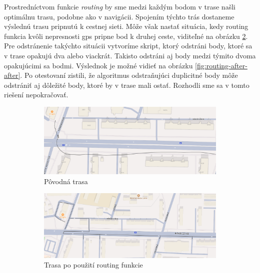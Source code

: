 Prostredníctvom funkcie \textit{routing} by sme medzi každým bodom v trase našli optimálnu trasu, podobne ako v navigácii. Spojením týchto trás dostaneme výslednú trasu pripnutú k cestnej sieti. Môže však nastať situácia, kedy routing funkcia kvôli nepresnosti \acrshort{gps} pripne bod k druhej ceste, viditeľné na obrázku \ref{fig:routing-after}. Pre odstránenie takýchto situácii vytvoríme skript, ktorý odstráni body, ktoré sa v trase opakujú dva alebo viackrát. Takisto odstráni aj body medzi týmito dvoma opakujúcimi sa bodmi. Výslednok je možné vidieť na obrázku \ref{fig:routing-after-after}. Po otestovaní zistili, že algoritmus odstraňujúci duplicitné body môže odstrániť aj dôležité body, ktoré by v trase mali ostať. Rozhodli sme sa v tomto riešení nepokračovať.

\begin{figure}
    \centering
    \begin{subfigure}{0.9\textwidth}
        \centering
        \includegraphics[width=\textwidth]{img/routing/pred.png}
        \caption{Pôvodná trasa}
        \label{fig:routing-original}
    \end{subfigure}
    \begin{subfigure}{0.9\textwidth}
        \centering
        \includegraphics[width=\textwidth]{img/routing/po.png}
        \caption{Trasa po použití routing funkcie}
        \label{fig:routing-after}
    \end{subfigure}
    \begin{subfigure}{0.9\textwidth}
        \centering

\end{subfigure}
\end{figure}
